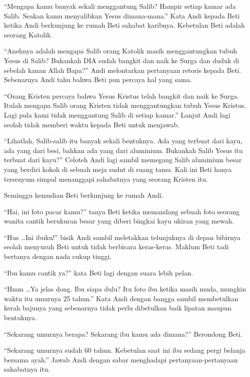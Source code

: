 
``Mengapa kamu banyak sekali menggantung Salib? Hampir setiap kamar ada Salib. Seakan kamu menyalibkan Yesus dimana-mana.'' Kata Andi kepada Beti ketika Andi berkunjung ke rumah Beti sahabat karibnya. Kebetulan Beti adalah seorang Katolik.

``Anehnya adalah mengapa Salib orang Katolik masih menggantungkan tubuh Yesus di Salib? Bukankah DIA sudah bangkit dan naik ke Surga dan duduk di sebelah kanan Allah Bapa?'' Andi melontarkan pertanyaan retoris kepada Beti. Sebenarnya Andi tahu bahwa Beti pun percaya hal yang sama.

``Orang Kristen percaya bahwa Yesus Kristus telah bangkit dan naik ke Surga. Itulah mengapa Salib orang Kristen tidak menggantungkan tubuh Yesus Kristus. Lagi pula kami tidak menggantung Salib di setiap kamar.'' Lanjut Andi lagi seolah tidak memberi waktu kepada Beti untuk menjawab.

``Lihatlah, Salib-salib itu banyak sekali bentuknya. Ada yang terbuat dari kayu, ada yang dari besi, bahkan ada yang dari aluminium. Bukankah Salib Yesus itu terbuat dari kayu?'' Celoteh Andi lagi sambil memegang Salib aluminium besar yang berdiri kokoh di sebuah meja sudut di ruang tamu. Kali ini Beti hanya tersenyum simpul menanggapi sahabatnya yang seorang Kristen itu.

Seminggu kemudian Beti berkunjung ke rumah Andi.

``Hai, ini foto pacar kamu?'' tanya Beti ketika memandang sebuah foto seorang wanita cantik berukuran besar yang diberi bingkai kayu ukiran yang mewah.

``Hus \ldots Ini ibuku!'' bisik Andi sambil meletakkan telunjuknya di depan bibirnya seolah menyuruh Beti untuk tidak berbicara keras-keras. Maklum Beti tadi bertanya dengan nada cukup tinggi.

``Ibu kamu cantik ya?'' kata Beti lagi dengan suara lebih pelan.

``Hmm \ldots Ya jelas dong. Ibu siapa dulu? Itu foto ibu ketika masih muda, mungkin waktu itu umurnya 25 tahun.'' Kata Andi dengan bangga sambil membetulkan kerah bajunya yang sebenarnya tidak perlu dibetulkan baik lipatan maupun bentuknya.

``Sekarang umurnya berapa? Sekarang ibu kamu ada dimana?'' Berondong Beti.

``Sekarang umurnya sudah 60 tahun. Kebetulan saat ini ibu sedang pergi belanja bersama ayah.'' Jawab Andi dengan sabar menghadapi pertanyaan-pertanyaan sahabatnya itu.

